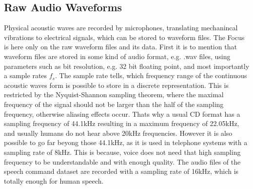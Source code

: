 \subsection{Raw Audio Waveforms}
Physical acoustic waves are recorded by microphones, translating mechanincal vibrations to electrical signals, which can be stored to waveform files.
The Focus is here only on the raw waveform files and its data.
First it is to mention that waveform files are stored in some kind of audio format, e.g. .wav files, using parameters such as bit resolution, e.g. 32 bit floating point, and most importantly a sample rates $f_s$. 
The sample rate tells, which frequency range of the continuous acoustic waves form is possible to store in a discrete representation.
This is restricted by the Nyquist-Shannon sampling theorem, where the maximal frequency of the signal should not be larger than the half of the sampling frequency, otherwise aliasing effects occur. 
Thats why a usual CD format has a sampling frequency of 44.1kHz resulting in a maximum frequency of 22.05kHz, and usually humans do not hear above 20kHz frequencies.
However it is also possible to go far beyong those 44.1kHz, as it is used in telephone systems with a sampling rate of 8kHz.
This is because, voice does not need that high sampling frequency to be understandable and with enough quality.
The audio files of the speech command dataset are recorded with a sampling rate of 16kHz, which is totally enough for human speech.
